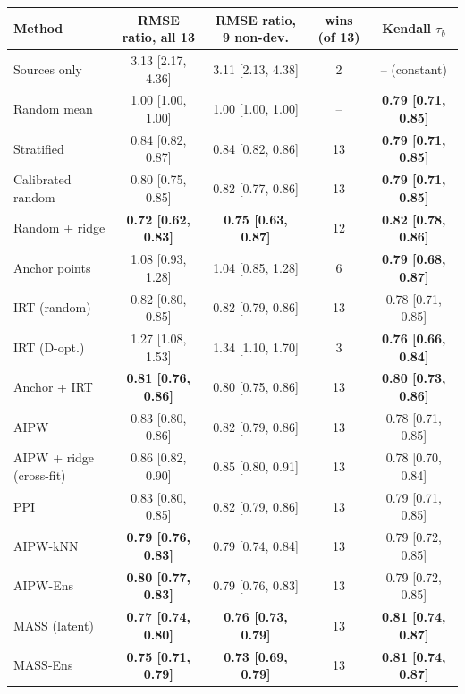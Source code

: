 \begin{tabular}{lcccc}
\toprule
Method & RMSE ratio, all 13 & RMSE ratio, 9 non-dev. & wins (of 13) & Kendall $\tau_b$ \\
\midrule
Sources only & 3.13 [2.17, 4.36] & 3.11 [2.13, 4.38] & 2 & -- (constant) \\
Random mean & 1.00 [1.00, 1.00] & 1.00 [1.00, 1.00] & -- & \textbf{0.79 [0.71, 0.85]} \\
Stratified & 0.84 [0.82, 0.87] & 0.84 [0.82, 0.86] & 13 & \textbf{0.79 [0.71, 0.85]} \\
Calibrated random & 0.80 [0.75, 0.85] & 0.82 [0.77, 0.86] & 13 & \textbf{0.79 [0.71, 0.85]} \\
Random + ridge & \textbf{0.72 [0.62, 0.83]} & \textbf{0.75 [0.63, 0.87]} & 12 & \textbf{0.82 [0.78, 0.86]} \\
Anchor points & 1.08 [0.93, 1.28] & 1.04 [0.85, 1.28] & 6 & \textbf{0.79 [0.68, 0.87]} \\
IRT (random) & 0.82 [0.80, 0.85] & 0.82 [0.79, 0.86] & 13 & 0.78 [0.71, 0.85] \\
IRT (D-opt.) & 1.27 [1.08, 1.53] & 1.34 [1.10, 1.70] & 3 & \textbf{0.76 [0.66, 0.84]} \\
Anchor + IRT & \textbf{0.81 [0.76, 0.86]} & 0.80 [0.75, 0.86] & 13 & \textbf{0.80 [0.73, 0.86]} \\
AIPW & 0.83 [0.80, 0.86] & 0.82 [0.79, 0.86] & 13 & 0.78 [0.71, 0.85] \\
AIPW + ridge (cross-fit) & 0.86 [0.82, 0.90] & 0.85 [0.80, 0.91] & 13 & 0.78 [0.70, 0.84] \\
PPI & 0.83 [0.80, 0.85] & 0.82 [0.79, 0.86] & 13 & 0.79 [0.71, 0.85] \\
AIPW-kNN & \textbf{0.79 [0.76, 0.83]} & 0.79 [0.74, 0.84] & 13 & 0.79 [0.72, 0.85] \\
AIPW-Ens & \textbf{0.80 [0.77, 0.83]} & 0.79 [0.76, 0.83] & 13 & 0.79 [0.72, 0.85] \\
MASS (latent) & \textbf{0.77 [0.74, 0.80]} & \textbf{0.76 [0.73, 0.79]} & 13 & \textbf{0.81 [0.74, 0.87]} \\
MASS-Ens & \textbf{0.75 [0.71, 0.79]} & \textbf{0.73 [0.69, 0.79]} & 13 & \textbf{0.81 [0.74, 0.87]} \\
\bottomrule
\end{tabular}
